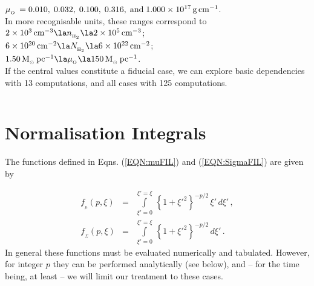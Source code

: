 \documentclass[usenatbib]{mn2e}
\newcommand{\subO}{_{_{\rm O}}}
\numberwithin{equation}{section}
\begin{document}
\noindent $\mu\subO\,=0.010,\;0.032,\;0.100,\;0.316,\;{\rm and}\;1.000\times 10^{17}\,{\rm g}\,{\rm cm}^{-1}$.\\

\noindent In more recognisable units, these ranges correspond to\\

\noindent $2\times 10^3\,{\rm cm}^{-3}\la n_{_{\rm H_2}}\la 2\times 10^5\,{\rm cm}^{-3}$;\\

\noindent $6\times 10^{20}\,{\rm cm}^{-2}\la N_{_{\rm H_2}}\la 6\times 10^{22}\,{\rm cm}^{-2}$;\\

\noindent $1.50\,{\rm M}_{_\odot}\,{\rm pc}^{-1}\la \mu\subO\la 150\,{\rm M}_{_\odot}\,{\rm pc}^{-1}$.\\

\noindent If the central values constitute a fiducial case, we can explore basic dependencies with 13 computations, and all cases with 125 computations.






\newpage $\,$ %

\appendix

\section{Normalisation Integrals}\label{APP:NormalisationIntegrals}

The functions defined in Eqns. (\ref{EQN:muFIL}) and (\ref{EQN:SigmaFIL}) are given by

\begin{eqnarray}
f_{_\mu}\!(p,\xi)&=&\int\limits_{\xi'=0}^{\xi'=\xi}\,\left\{1+\xi'^2\right\}^{-p/2}\,\xi'\,d\xi'\,, \\
f_{_\Sigma}\!(p,\xi)&=&\int\limits_{\xi'=0}^{\xi'=\xi}\,\left\{1+\xi'^2\right\}^{-p/2}\,d\xi'\,.
\end{eqnarray}
In general these functions must be evaluated numerically and tabulated. However, for integer $p$ they can be performed analytically (see below), and -- for the time being, at least -- we will limit our treatment to these cases.
\end{document}
